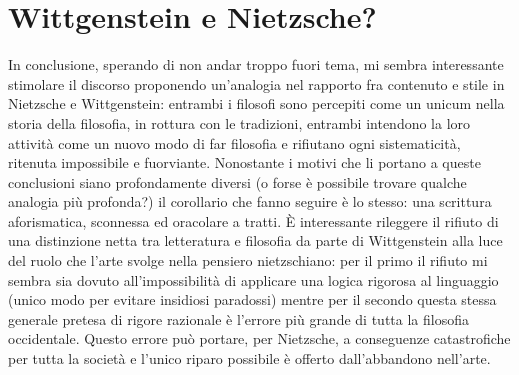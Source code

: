 \documentclass[10pt,a4paper]{article}
\begin{document}
\section{Wittgenstein e Nietzsche?}
In conclusione, sperando di non andar troppo fuori tema, mi sembra interessante stimolare il discorso proponendo un’analogia nel rapporto fra contenuto e stile in Nietzsche e Wittgenstein: entrambi i filosofi sono percepiti come un unicum nella storia della filosofia, in rottura con le tradizioni, entrambi intendono la loro attività come un nuovo modo di far filosofia e rifiutano ogni sistematicità, ritenuta impossibile e fuorviante. Nonostante i motivi che li portano a queste conclusioni siano profondamente diversi (o forse è possibile trovare qualche analogia più profonda?) il corollario che fanno seguire è lo stesso: una scrittura aforismatica, sconnessa ed oracolare a tratti. È interessante rileggere il rifiuto di una distinzione netta tra letteratura e filosofia  da parte di Wittgenstein alla luce del ruolo che l’arte svolge nella pensiero nietzschiano: per il primo il rifiuto mi sembra sia dovuto all’impossibilità di applicare una logica rigorosa al linguaggio (unico modo per evitare insidiosi paradossi) mentre per il secondo questa stessa generale pretesa di rigore razionale è l’errore più grande di tutta la filosofia occidentale. Questo errore può portare, per Nietzsche, a conseguenze catastrofiche per tutta la società e l’unico riparo possibile è offerto dall’abbandono nell’arte.
\end{document}
